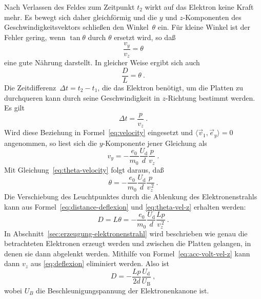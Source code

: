 Nach Verlassen des Feldes zum Zeitpunkt $t_2$ wirkt auf das Elektron
keine Kraft mehr. Es bewegt sich daher gleichförmig und die $y$ und
$z$-Komponenten des Geschwindigkeitsvektors schließen den
Winkel~$\theta$ ein. Für kleine Winkel ist der Fehler gering, wenn
$\tan\theta$ durch $\theta$ ersetzt wird, so daß
%
\begin{equation}
  \label{eq:theta-velocity}
  \frac{v_y}{v_z} = \theta
\end{equation}
%
eine gute Nährung darstellt. In gleicher Weise ergibt sich  auch
%
\begin{equation}
  \label{eq:distance-deflexion}
  \frac{D}{L} = \theta \:.
\end{equation}
%
Die Zeitdifferenz~$\Delta t = t_2-t_1$, die das Elektron benötigt, um
die Platten zu durchqueren kann durch seine Geschwindigkeit in
$z$-Richtung bestimmt werden. Es gilt
%
\begin{equation}
  \Delta t = \frac{p}{v_z} \:.
\end{equation}
%
Wird diese Beziehung in Formel~\eqref{eq:velocity} eingesetzt und
$\langle\vec{v}_1,\vec{e}_y\rangle = 0$ angenommen, so
liest sich die $y$-Komponente jener Gleichung als
%
\begin{equation}
  \label{eq:vel-y-vel-z}
  v_y = - \frac{e_0}{m_0}\frac{U_\text{d}}{d} \frac{p}{v_z} \:.
\end{equation}
%
Mit Gleichung~\eqref{eq:theta-velocity} folgt daraus, daß
%
\begin{equation}
  \label{eq:theta-vel-z}
  \theta = - \frac{e_0}{m_0}\frac{U_\text{d}}{d} \frac{p}{v_z^{\,2}} \:.
\end{equation}
%
Die Verschiebung des Leuchtpunktes durch die Ablenkung des
Elektronenstrahls kann aus Formel~\eqref{eq:distance-deflexion} und
\eqref{eq:theta-vel-z} erhalten werden:
%
\begin{equation}
  \label{eq:deflexion}
  D = L\theta = - \frac{e_0}{m_0}\frac{U_\text{d}}{d} \frac{Lp}{v_z^{\,2}} \:.
\end{equation}
%
In Abschnitt~\vref{sec:erzeugung-elektronenstrahl} wird beschrieben wie
genau die betrachteten Elektronen erzeugt werden und zwischen die
Platten gelangen, in denen sie dann abgelenkt werden. Mithilfe von
Formel~\eqref{eq:acc-volt-vel-z} kann dann $v_z$ aus
\eqref{eq:deflexion} eliminiert werden. Also ist
%
\begin{equation}
  D = - \frac{Lp}{2d} \frac{U_\text{d}}{U_\text{B}} \:,
\end{equation}
%
wobei $U_B$ die Beschleunigungspannung der Elektronenkanone ist.

